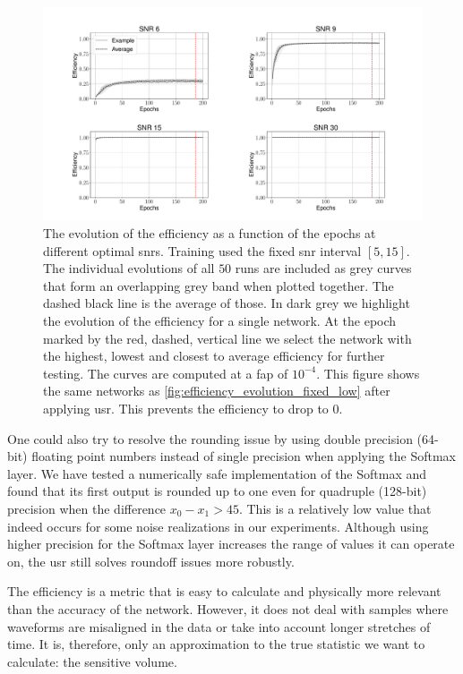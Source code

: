 \begin{figure}
    \centering
    \includegraphics[width=\textwidth]{chapters/training_strats/images/fixed_low_lin.pdf}
    \caption[Network efficiency evolution fixed low strategy with unbounded Softmax replacement]{The evolution of the efficiency as a function of the epochs at different optimal \acrshort{snr}s. Training used the fixed \acrshort{snr} interval $\left[5,15\right]$. The individual evolutions of all $50$ runs are included as grey curves that form an overlapping grey band when plotted together. The dashed black line is the average of those. In dark grey we highlight the evolution of the efficiency for a single network. At the epoch marked by the red, dashed, vertical line we select the network with the highest, lowest and closest to average efficiency for further testing. The curves are computed at a \acrshort{fap} of $10^{-4}$. This figure shows the same networks as \autoref{fig:efficiency_evolution_fixed_low} after applying \acrshort{usr}. This prevents the efficiency to drop to 0.}
    \label{fig:efficiency_evolution_fixed_low_lin}
\end{figure}

One could also try to resolve the rounding issue by using double precision (64-bit) floating point numbers instead of single precision when applying the Softmax layer. We have tested a numerically safe implementation of the Softmax and found that its first output is rounded up to one even for quadruple (128-bit) precision when the difference $x_0-x_1>45$. This is a relatively low value that indeed occurs for some noise realizations in our experiments. Although using higher precision for the Softmax layer increases the range of values it can operate on, the \acrshort{usr} still solves roundoff issues more robustly.

The efficiency is a metric that is easy to calculate and physically more relevant than the accuracy of the network. However, it does not deal with samples where waveforms are misaligned in the data or take into account longer stretches of time. It is, therefore, only an approximation to the true statistic we want to calculate: the sensitive volume.

